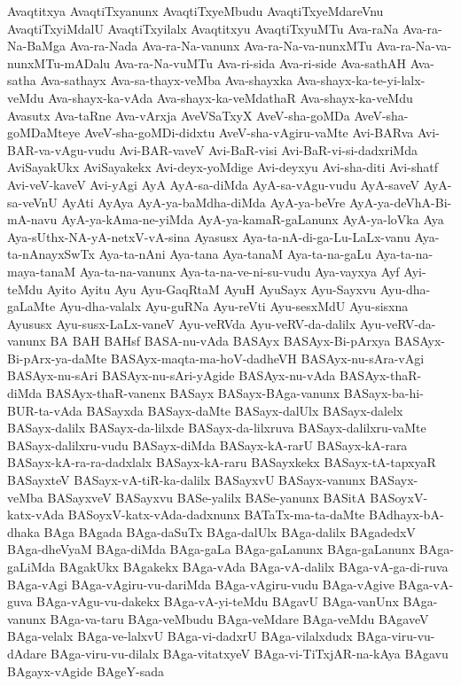 {Avaqtitxya
AvaqtiTxyanunx
AvaqtiTxyeMbudu
AvaqtiTxyeMdareVnu
AvaqtiTxyiMdalU
AvaqtiTxyilalx
Avaqtitxyu
AvaqtiTxyuMTu
Ava-raNa
Ava-ra-Na-BaMga
Ava-ra-Nada
Ava-ra-Na-vanunx
Ava-ra-Na-va-nunxMTu
Ava-ra-Na-va-nunxMTu-mADalu
Ava-ra-Na-vuMTu
Ava-ri-sida
Ava-ri-side
Ava-sathAH
Ava-satha
Ava-sathayx
Ava-sa-thayx-veMba
Ava-shayxka
Ava-shayx-ka-te-yi-lalx-veMdu
Ava-shayx-ka-vAda
Ava-shayx-ka-veMdathaR
Ava-shayx-ka-veMdu
Avasutx
Ava-taRne
Ava-vArxja
AveVSaTxyX
AveV-sha-goMDa
AveV-sha-goMDaMteye
AveV-sha-goMDi-didxtu
AveV-sha-vAgiru-vaMte
Avi-BARva
Avi-BAR-va-vAgu-vudu
Avi-BAR-vaveV
Avi-BaR-visi
Avi-BaR-vi-si-dadxriMda
AviSayakUkx
AviSayakekx
Avi-deyx-yoMdige
Avi-deyxyu
Avi-sha-diti
Avi-shatf
Avi-veV-kaveV
Avi-yAgi
AyA
AyA-sa-diMda
AyA-sa-vAgu-vudu
AyA-saveV
AyA-sa-veVnU
AyAti
AyAya
AyA-ya-baMdha-diMda
AyA-ya-beVre
AyA-ya-deVhA-Bi-mA-navu
AyA-ya-kAma-ne-yiMda
AyA-ya-kamaR-gaLanunx
AyA-ya-loVka
Aya
Aya-sUthx-NA-yA-netxV-vA-sina
Ayasusx
Aya-ta-nA-di-ga-Lu-LaLx-vanu
Aya-ta-nAnayxSwTx
Aya-ta-nAni
Aya-tana
Aya-tanaM
Aya-ta-na-gaLu
Aya-ta-na-maya-tanaM
Aya-ta-na-vanunx
Aya-ta-na-ve-ni-su-vudu
Aya-vayxya
Ayf
Ayi-teMdu
Ayito
Ayitu
Ayu
Ayu-GaqRtaM
AyuH
AyuSayx
Ayu-Sayxvu
Ayu-dha-gaLaMte
Ayu-dha-valalx
Ayu-guRNa
Ayu-reVti
Ayu-sesxMdU
Ayu-sisxna
Ayususx
Ayu-susx-LaLx-vaneV
Ayu-veRVda
Ayu-veRV-da-dalilx
Ayu-veRV-da-vanunx
BA
BAH
BAHsf
BASA-nu-vAda
BASAyx
BASAyx-Bi-pArxya
BASAyx-Bi-pArx-ya-daMte
BASAyx-maqta-ma-hoV-dadheVH
BASAyx-nu-sAra-vAgi
BASAyx-nu-sAri
BASAyx-nu-sAri-yAgide
BASAyx-nu-vAda
BASAyx-thaR-diMda
BASAyx-thaR-vanenx
BASayx
BASayx-BAga-vanunx
BASayx-ba-hi-BUR-ta-vAda
BASayxda
BASayx-daMte
BASayx-dalUlx
BASayx-dalelx
BASayx-dalilx
BASayx-da-lilxde
BASayx-da-lilxruva
BASayx-dalilxru-vaMte
BASayx-dalilxru-vudu
BASayx-diMda
BASayx-kA-rarU
BASayx-kA-rara
BASayx-kA-ra-ra-dadxlalx
BASayx-kA-raru
BASayxkekx
BASayx-tA-tapxyaR
BASayxteV
BASayx-vA-tiR-ka-dalilx
BASayxvU
BASayx-vanunx
BASayx-veMba
BASayxveV
BASayxvu
BASe-yalilx
BASe-yanunx
BASitA
BASoyxV-katx-vAda
BASoyxV-katx-vAda-dadxnunx
BATaTx-ma-ta-daMte
BAdhayx-bA-dhaka
BAga
BAgada
BAga-daSuTx
BAga-dalUlx
BAga-dalilx
BAgadedxV
BAga-dheVyaM
BAga-diMda
BAga-gaLa
BAga-gaLanunx
BAga-gaLanunx
BAga-gaLiMda
BAgakUkx
BAgakekx
BAga-vAda
BAga-vA-dalilx
BAga-vA-ga-di-ruva
BAga-vAgi
BAga-vAgiru-vu-dariMda
BAga-vAgiru-vudu
BAga-vAgive
BAga-vA-guva
BAga-vAgu-vu-dakekx
BAga-vA-yi-teMdu
BAgavU
BAga-vanUnx
BAga-vanunx
BAga-va-taru
BAga-veMbudu
BAga-veMdare
BAga-veMdu
BAgaveV
BAga-velalx
BAga-ve-lalxvU
BAga-vi-dadxrU
BAga-vilalxdudx
BAga-viru-vu-dAdare
BAga-viru-vu-dilalx
BAga-vitatxyeV
BAga-vi-TiTxjAR-na-kAya
BAgavu
BAgayx-vAgide
BAgeY-sada
}
